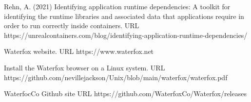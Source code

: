 \documentclass[a4paper]{article}  %
\begin{document}
\begin{thebibliography}{99}
Rehn, A. (2021)
Identifying application runtime dependencies: A toolkit for identifying the runtime libraries and associated data that applications require in order to run correctly inside containers. 
URL https://unrealcontainers.com/blog/identifying-application-runtime-dependencies/

Waterfox website. URL https://www.waterfox.net

Install the Waterfox browser on a Linux system. URL https://github.com/nevillejackson/Unix/blob/main/waterfox/waterfox.pdf

WaterfocCo Github site URL https://github.com/WaterfoxCo/Waterfox/releases

\end{thebibliography}
\end{document}
